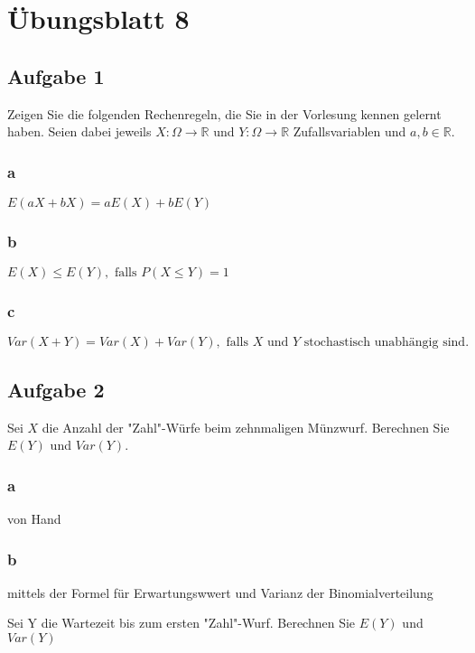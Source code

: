 \chapter{Übungsblatt 8}

\section{Aufgabe 1}

Zeigen Sie die folgenden Rechenregeln, die Sie in der Vorlesung kennen gelernt haben. Seien dabei jeweils $X : \Omega \rightarrow \mathbb{R}$ und $Y : \Omega \rightarrow \mathbb{R}$ Zufallsvariablen und $a, b \in \mathbb{R}$.

\subsection{a}

$E(aX + bX) = aE(X) + bE(Y)$

\subsection{b}

$E(X) \leq E(Y), \text{ falls } P(X \leq Y) = 1$

\subsection{c}

$Var(X + Y) = Var(X) + Var(Y), \text{ falls } X \text{ und } Y \text{ stochastisch unabhängig sind}.$

\section{Aufgabe 2}

Sei $X$ die Anzahl der "Zahl"-Würfe beim zehnmaligen Münzwurf. Berechnen Sie $E(Y)$ und $Var(Y)$.

\subsection{a}
von Hand

\subsection{b}
mittels der Formel für Erwartungswwert und Varianz der Binomialverteilung

Sei Y die Wartezeit bis zum ersten "Zahl"-Wurf. Berechnen Sie $E(Y)$ und $Var(Y)$

